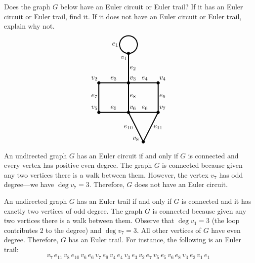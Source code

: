 \documentclass[11pt,letterpaper]{article}
\begin{document}

 Does the graph $G$ below have an Euler circuit or Euler trail? If it has an Euler circuit or Euler trail, find it. If it does not have an Euler circuit or Euler trail, explain why not. 
	\[
	\begin{tikzpicture}[scale=1.5]
	\draw[line width=0.05cm] (0,2.3) circle (0.3);
	\draw[line width=0.05cm] (0,2) to (0,1);
	\draw[line width=0.05cm] (-1,1) to (1,1);
	\draw[line width=0.05cm] (-1,0) to (1,0);
	\draw[line width=0.05cm] (-1,1) to (-1,0);
	\draw[line width=0.05cm] (1,1) to (1,0);
	\draw[line width=0.05cm] (0,1) to (0,0);
	\draw[line width=0.05cm] (0,0) to (0.5,-1);
	\draw[line width=0.05cm] (1,0) to (0.5,-1);
	
	\draw[fill= black] (0,2) circle (0.05);
	\draw[fill= black] (-1,1) circle (0.05);
	\draw[fill= black] (0,1) circle (0.05);
	\draw[fill= black] (1,1) circle (0.05);
	\draw[fill= black] (-1,0) circle (0.05);
	\draw[fill= black] (0,0) circle (0.05);
	\draw[fill= black] (1,0) circle (0.05);
	\draw[fill= black] (0.5,-1) circle (0.05);
	
	\node at (-0.15,1.85) {$v_1$};
	\node at (-1.15,1.15) {$v_2$};
	\node at (0.15,1.15) {$v_3$};
	\node at (1.15,1.15) {$v_4$};
	\node at (-1.15,0.15) {$v_5$};
	\node at (0.15,0.15) {$v_6$};
	\node at (1.15,0.15) {$v_7$};
	\node at (0.25,-0.90) {$v_8$};

	\node at (-0.45,2.3) {$e_1$};
	\node at (0.15,1.5) {$e_2$};
	\node at (-0.5, 1.15) {$e_3$};
	\node at (0.55,1.15) {$e_4$};
	\node at (-0.5,0.15) {$e_5$};
	\node at (0.55,0.15) {$e_6$};
	\node at (-1.15,0.55) {$e_7$};
	\node at (0.15,0.55) {$e_8$};
	\node at (1.15,0.55) {$e_9$};
	\node at (0,-0.5) {$e_{10}$};
	\node at (1,-0.5) {$e_{11}$};
	\end{tikzpicture}
	\] \pspace

\sol An undirected graph $G$ has an Euler circuit if and only if $G$ is connected and every vertex has positive even degree. The graph $G$ is connected because given any two vertices there is a walk between them. However, the vertex $v_7$ has odd degree---we have $\deg v_7= 3$. Therefore, $G$ does not have an Euler circuit. \pspace

An undirected graph $G$ has an Euler trail if and only if $G$ is connected and it has exactly two vertices of odd degree. The graph $G$ is connected because given any two vertices there is a walk between them. Observe that $\deg v_1= 3$ (the loop contributes 2 to the degree) and $\deg v_7= 3$. All other vertices of $G$ have even degree. Therefore, $G$ has an Euler trail. For instance, the following is an Euler trail:
	\[
	v_7 \, e_{11} \, v_8 \, e_{10} \, v_6 \, e_6 \, v_7 \, e_9 \, v_4 \, e_4 \, v_3 \, e_3 \, v_2 \, e_7 \, v_5 \, e_5 \, v_6 \, e_8 \, v_3 \, e_2 \, v_1 \, e_1
	\]
\end{document}
